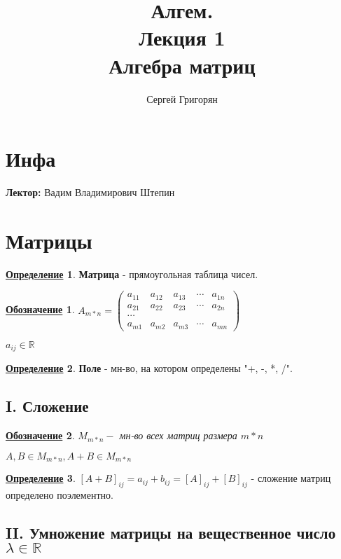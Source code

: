 \documentclass[12pt]{article}
\title{Алгем. \\ Лекция 1 \\ Алгебра матриц}
\author{Сергей Григорян}
\newcommand{\R}{\mathbb{R}}
\newtheorem*{symb}{\underline{Обозначение}}
\theoremstyle{definition}
\newtheorem{definition}{\underline{Определение}}[section]
\theoremstyle{definition}
\begin{document}
\maketitle
\newpage
\section{Инфа}
\textbf{Лектор:} Вадим Владимирович Штепин

\section{Матрицы}

\begin{definition}
\textbf{Матрица} - прямоугольная таблица чисел.
\end{definition}

\begin{symb}
    $A_{m*n} = \begin{pmatrix} a_{11} & a_{12} & a_{13} & \cdots & a_{1n} \\ 
    a_{21} & a_{22} & a_{23} & \cdots & a_{2n} \\ 
    \cdots \\ 
a_{m1} & a_{m2} & a_{m3} & \cdots & a_{mn}\end{pmatrix}$

    $a_{ij} \in \R$
\end{symb}

\begin{definition}
\textbf{Поле} - мн-во, на котором определены "+, -, *, /".
\end{definition}

\subsection{I. Сложение}

\begin{symb}
$M_{m * n} - $ мн-во всех матриц размера $m * n$

$A, B \in M_{m * n}, A + B \in M_{m * n}$
\end{symb}

\begin{definition}
    $[A + B]_{ij} = a_{ij} + b_{ij} = [A]_{ij} + [B]_{ij}$ - сложение матриц определено поэлементно.
\end{definition}

\subsection{II. Умножение матрицы на вещественное число $\lambda \in \R$}
\end{document}
